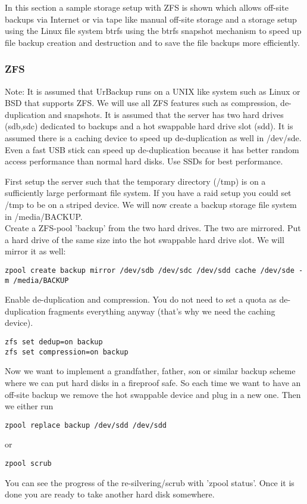 \documentclass[a4paper,10pt]{article}
\begin{document}
In this section a sample storage setup with ZFS is shown which allows off-site
backups via Internet or via tape like manual off-site storage and a storage setup
using the Linux file system btrfs using the btrfs snapshot mechanism to speed
up file backup creation and destruction and to save the file backups more efficiently.

\subsubsection{ZFS}
\label{subsec_ZFS_setup}

Note: It is assumed that UrBackup runs on a UNIX like system such as Linux or BSD that supports ZFS. We will use all ZFS features such as compression, de-duplication and snapshots. It is assumed that the server has two hard drives (sdb,sdc) dedicated to backups and a hot swappable hard drive slot (sdd). It is assumed there is a caching device to speed up de-duplication as well in /dev/sde. Even a fast USB stick can speed up de-duplication because it has better random access performance than normal hard disks. Use SSDs for best performance. 

First setup the server such that the temporary directory (/tmp) is on a sufficiently large performant file system. If you have a raid setup you could set /tmp to be on a striped device. We will now create a backup storage file system in /media/BACKUP.\\
Create a ZFS-pool 'backup' from the two hard drives. The two are mirrored. Put a hard drive of the same size into the hot swappable hard drive slot. We will mirror it as well:
\begin{verbatim}
zpool create backup mirror /dev/sdb /dev/sdc /dev/sdd cache /dev/sde -m /media/BACKUP
\end{verbatim}
Enable de-duplication and compression. You do not need to set a quota as de-duplication fragments everything anyway (that's why we need the caching device).
\begin{verbatim}
zfs set dedup=on backup
zfs set compression=on backup
\end{verbatim}
Now we want to implement a grandfather, father, son or similar backup scheme where we can put hard disks in a fireproof safe. So each time we want to have an off-site backup we remove the hot swappable device and plug in a new one. Then we either run
\begin{verbatim}
zpool replace backup /dev/sdd /dev/sdd
\end{verbatim}
or
\begin{verbatim}
zpool scrub
\end{verbatim}
You can see the progress of the re-silvering/scrub with 'zpool status'. Once it is done you are ready to take another hard disk somewhere.
\end{document}
